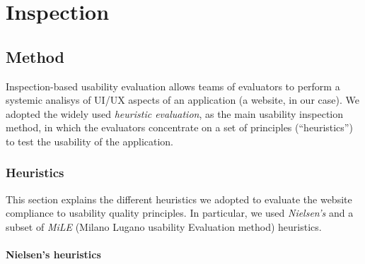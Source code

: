 

\section{Inspection}

\subsection{Method}
Inspection-based usability evaluation allows teams of evaluators to perform
a systemic analisys of UI/UX aspects of an application (a website, in our case).
We adopted the widely used \emph{heuristic evaluation}, as the main usability inspection method, in which the evaluators concentrate on a set of principles (``heuristics'') to test the usability of the application.

\subsubsection{Heuristics}

This section explains the different heuristics we adopted to evaluate the
website compliance to usability quality principles. In particular, we used
\emph{Nielsen's} and a subset of \emph{MiLE} (Milano Lugano usability Evaluation method) heuristics.

\paragraph*{Nielsen's heuristics}

